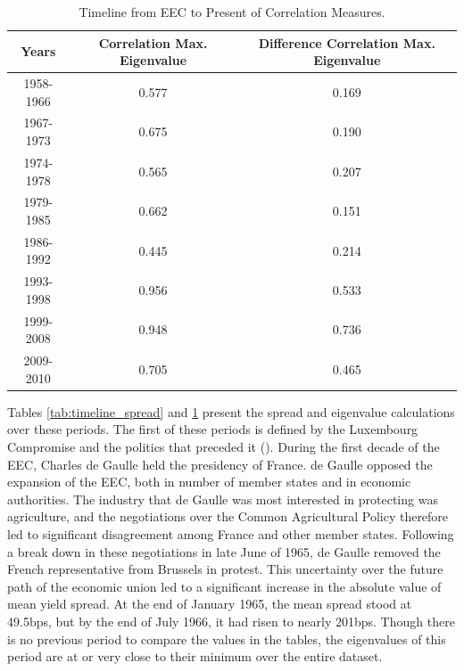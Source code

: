 \documentclass[3p]{elsarticle}
\begin{document}
\begin{table}[ht!]
	\centering
	\begin{tabular}{|c|c|c|}
		\hline
		\textbf{Years} & \textbf{Correlation Max. Eigenvalue} & \textbf{Difference Correlation Max. Eigenvalue}\\\hline
1958-1966 & 0.577 & 0.169\\\hline
1967-1973 & 0.675 & 0.190\\\hline
1974-1978 & 0.565 & 0.207\\\hline
1979-1985 & 0.662 & 0.151\\\hline
1986-1992 & 0.445 & 0.214\\\hline
1993-1998 & 0.956 & 0.533\\\hline
1999-2008 & 0.948 & 0.736\\\hline
2009-2010 & 0.705 & 0.465\\\hline
	\end{tabular}
	\caption{Timeline from EEC to Present of Correlation Measures.}
	\label{tab:timeline_eig}
\end{table}

Tables \ref{tab:timeline_spread} and \ref{tab:timeline_eig} present the spread and eigenvalue calculations over these periods.  The first of these periods is defined by the Luxembourg Compromise and the politics that preceded it (\cite{Garret1995}).  During the first decade of the EEC, Charles de Gaulle held the presidency of France.  de Gaulle opposed the expansion of the EEC, both in number of member states and in economic authorities.  The industry that de Gaulle was most interested in protecting was agriculture, and the negotiations over the Common Agricultural Policy therefore led to significant disagreement among France and other member states.  Following a break down in these negotiations in late June of 1965, de Gaulle removed the French representative from Brussels in protest.  This uncertainty over the future path of the economic union led to a significant increase in the absolute value of mean yield spread.  At the end of January 1965, the mean spread stood at 49.5bps, but by the end of July 1966, it had risen to nearly 201bps.  Though there is no previous period to compare the values in the tables, the eigenvalues of this period are at or very close to their minimum over the entire dataset.
\end{document}
